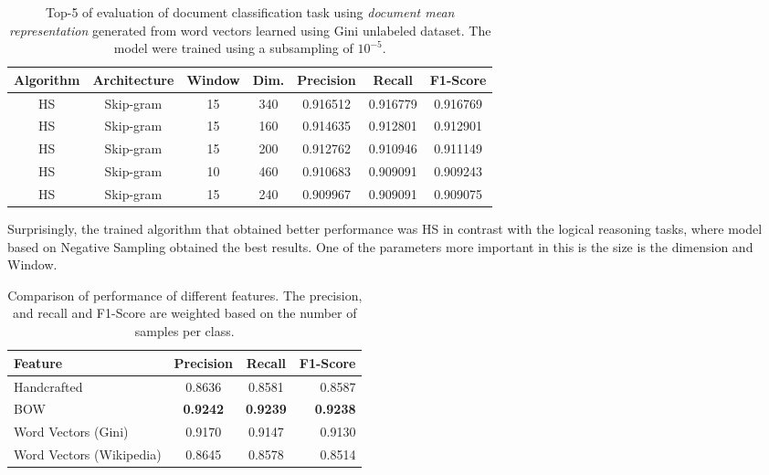 \begin{table}[h]

  \centering
  \caption{Top-5 of evaluation of document classification task using
    \textit{document mean representation} generated from word vectors learned
  using Gini unlabeled dataset. The model were trained using a subsampling of
  $10^{-5}$.}
  \label{tab:w2v4tc_ginig_w2v_evaluation}

\small
\begin{tabular}{|c|c|c|c|c|c|c|}
\hline
 Algorithm  &  Architecture  &  Window  &  Dim.  &  Precision  &    Recall  &  F1-Score  \\
\hline
\ac{HS}    &  Skip-gram     &      15  &   340  &   0.916512  &  0.916779  &  0.916769  \\
\ac{HS}    &  Skip-gram     &      15  &   160  &   0.914635  &  0.912801  &  0.912901  \\
\ac{HS}    &  Skip-gram     &      15  &   200  &   0.912762  &  0.910946  &  0.911149  \\
\ac{HS}    &  Skip-gram     &      10  &   460  &   0.910683  &  0.909091  &  0.909243  \\
\ac{HS}    &  Skip-gram     &      15  &   240  &   0.909967  &  0.909091  & 0.909075  \\
\hline
\end{tabular}
\end{table}

Surprisingly, the trained algorithm that obtained better performance was
\ac{HS} in contrast  with the logical reasoning tasks, where model based on
Negative Sampling obtained the best results.  One of the parameters more
important in this is the size is the dimension and Window. 




\begin{table}[h]
  \centering
  \caption{Comparison of performance of different features. The precision,
    and recall and F1-Score are weighted based on the number of samples per class.}
  \label{tab:w2v4tc_ginig_w2v_main_comparisson}
  
  \small
  \begin{tabular}{|l|c|c|r|}
    \hline
    Feature                   &  Precision  &  Recall  &  F1-Score  \\
    \hline
    Handcrafted               &     0.8636  &  0.8581  &    0.8587  \\
    \ac{BOW}                  &     \textbf{0.9242}  & \textbf{ 0.9239}  &   \textbf{ 0.9238}  \\
    Word Vectors (Gini)       &     0.9170  &  0.9147  &    0.9130  \\
    Word Vectors (Wikipedia)  &     0.8645  &  0.8578  &    0.8514  \\
    \hline
  \end{tabular}
\end{table}






